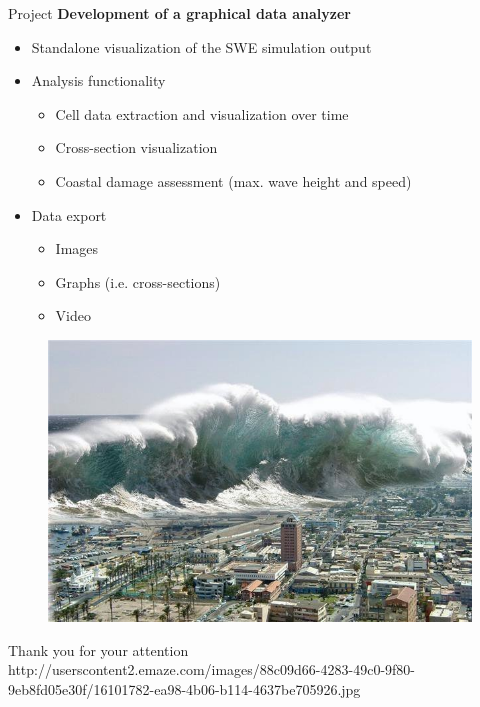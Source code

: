 \documentclass[shortpres,usenames,dvipsnames]{beamer}
\newcommand{\imgfullscale}{0.75}
\begin{document}
\begin{frame}{Project}
	\textbf{Development of a graphical data analyzer}
	\begin{itemize}
		\item Standalone visualization of the SWE simulation output
		\item Analysis functionality
		\begin{itemize}
			\item Cell data extraction and visualization over time
			\item Cross-section visualization
			\item Coastal damage assessment (max. wave height and speed)
		\end{itemize}
		\item Data export
		\begin{itemize}
			\item Images
			\item Graphs (i.e. cross-sections)
			\item Video
		\end{itemize}
	\end{itemize}
\end{frame}

\begin{frame}{}
	\begin{figure}
		\includegraphics[clip, width=\imgfullscale\linewidth]{img/tsunami.jpg}
	\end{figure}
	\centering
	Thank you for your attention
	\\
	\vfill
	\flushleft
	{\fontsize{5}{5} \selectfont http://userscontent2.emaze.com/images/88c09d66-4283-49c0-9f80-9eb8fd05e30f/16101782-ea98-4b06-b114-4637be705926.jpg}
\end{frame}
	
\end{document}
